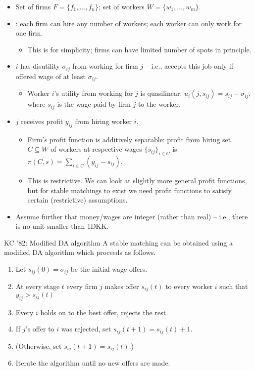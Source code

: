 \documentclass[english,10pt
,aspectratio=169
]{beamer}
\begin{document}
\begin{frame}{\cite{kelso_job_1982}}
\begin{itemize}
	\item Set of firms $F = \{f_1, ..., f_n\}$; set of workers $W = \{w_1, ..., w_m\}$.
	\item {}: each firm can hire any number of workers; each worker can only work for one firm.
	\begin{itemize}
		\item This is for simplicity; firms can have limited number of spots in principle.
	\end{itemize}
	\item {} $i$ has disutility $\sigma_{ij}$ from working for firm $j$ -- i.e., accepts this job only if offered wage of at least $\sigma_{ij}$.
	\begin{itemize}
		\item Worker $i$'s utility from working for $j$ is quasilinear: \alert{$u_i(j,s_{ij}) = s_{ij} - \sigma_{ij}$}, where $s_{ij}$ is the wage paid by firm $j$ to the worker.
	\end{itemize}
	\item {} $j$ receives profit $y_{ij}$ from hiring worker $i$.
	\begin{itemize}
		\item Firm's profit function is additively separable: profit from hiring set $C \subseteq W$ of workers at respective wages $\{s_{ij}\}_{i \in C}$ is \alert{$\pi(C,s) = \sum_{i \in C} (y_{ij} - s_{ij})$}.
		\item This is \alert{restrictive}. We can look at slightly more general profit functions, but for stable matchings to exist we need profit functions to satisfy certain (restrictive) assumptions.
	\end{itemize}
	\item Assume further that money/wages are integer (rather than real) -- i.e., there is no unit smaller than 1DKK.
\end{itemize}
\end{frame}


\begin{frame}{KC '82: Modified DA algorithm}
A stable matching can be obtained using a modified DA algorithm which proceeds as follows.
	\begin{enumerate}
		\item Let $s_{ij}(0) = \sigma_{ij}$ be the initial wage offers.
		\item At every stage $t$ every firm $j$ makes offer $s_{ij}(t)$ to every worker $i$ such that $y_{ij} > s_{ij}(t)$
		\item Every $i$ holds on to the best offer, rejects the rest.
		\item If $j$'s offer to $i$ was rejected, set $s_{ij}(t+1) = s_{ij}(t) + 1$.
		\item (Otherwise, set $s_{ij}(t+1) = s_{ij}(t)$.)
		\item Iterate the algorithm until no new offers are made.
	\end{enumerate}
\end{frame}
\end{document}

